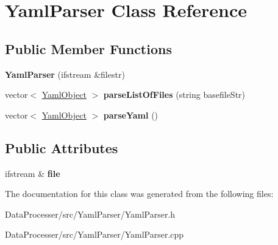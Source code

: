 \hypertarget{classYamlParser}{}\section{Yaml\+Parser Class Reference}
\label{classYamlParser}
\subsection*{Public Member Functions}
\begin{DoxyCompactItemize}
\item 
\mbox{\label{classYamlParser_af92bd8a6ba2534b00c685ee66c97a0e8}} 
{\bfseries Yaml\+Parser} (ifstream \&filestr)
\item 
\mbox{\label{classYamlParser_a8a3bc01ae9a8d5ba769cbc0f4e5e39bb}} 
vector$<$ \hyperlink{classYamlObject}{Yaml\+Object} $>$ {\bfseries parse\+List\+Of\+Files} (string basefile\+Str)
\item 
\mbox{\label{classYamlParser_a83725c913c18c9dd055517978ad9ab86}} 
vector$<$ \hyperlink{classYamlObject}{Yaml\+Object} $>$ {\bfseries parse\+Yaml} ()
\end{DoxyCompactItemize}
\subsection*{Public Attributes}
\begin{DoxyCompactItemize}
\item 
\mbox{\label{classYamlParser_a0aafce56f5c4536636d1e5c9dc603d26}} 
ifstream \& {\bfseries file}
\end{DoxyCompactItemize}


The documentation for this class was generated from the following files\+:\begin{DoxyCompactItemize}
\item 
Data\+Processer/src/\+Yaml\+Parser/Yaml\+Parser.\+h\item 
Data\+Processer/src/\+Yaml\+Parser/Yaml\+Parser.\+cpp\end{DoxyCompactItemize}
